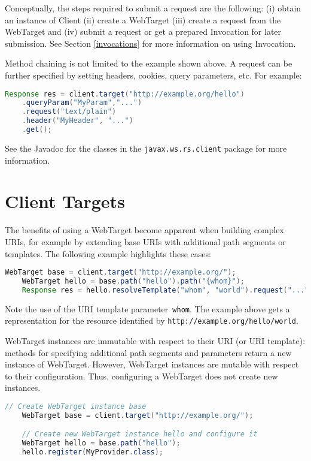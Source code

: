 Conceptually, the steps required to submit a request are the following: (i) obtain an instance of Client (ii) create a
WebTarget (iii) create a request from the WebTarget and (iv) submit a request or get a prepared Invocation for later
submission. See Section \ref{invocations} for more information on using Invocation.

Method chaining is not limited to the example shown above. A request can be further specified by setting headers,
cookies, query parameters, etc. For example:

\begin{lstlisting}[language=Java]
    Response res = client.target("http://example.org/hello")
    .queryParam("MyParam","...")
    .request("text/plain")
    .header("MyHeader", "...")
    .get();
\end{lstlisting}

See the Javadoc for the classes in the \lstinline{javax.ws.rs.client} package for more information.

\section{Client Targets}

The benefits of using a WebTarget become apparent when building complex URIs, for example by extending base URIs with
additional path segments or templates. The following example highlights these cases:

\begin{lstlisting}[language=Java]
    WebTarget base = client.target("http://example.org/");
    WebTarget hello = base.path("hello").path("{whom}");
    Response res = hello.resolveTemplate("whom", "world").request("...").get();
\end{lstlisting}

Note the use of the URI template parameter~\lstinline{whom}. The example above gets a representation for the resource
identified by \lstinline{http://example.org/hello/world}.

\textcolor{highlight green}{WebTarget instances are immutable with respect to their URI (or URI template)}: methods for
specifying additional path segments and parameters return a new instance of WebTarget. However,
\textcolor{highlight green}{WebTarget instances are mutable with respect to their configuration}. Thus, configuring a
WebTarget does not create new instances.

\begin{lstlisting}[language=Java]
    // Create WebTarget instance base
    WebTarget base = client.target("http://example.org/");

    // Create new WebTarget instance hello and configure it
    WebTarget hello = base.path("hello");
    hello.register(MyProvider.class);
\end{lstlisting}

